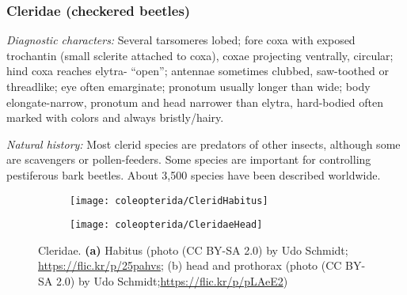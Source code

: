 \subsubsection{Cleridae (checkered beetles)}
\noindent{}\textit{Diagnostic characters:} Several tarsomeres lobed; fore coxa with exposed trochantin (small sclerite attached to coxa), coxae projecting ventrally, circular; hind coxa reaches elytra- ``open''; antennae sometimes clubbed, saw-toothed or threadlike; eye often emarginate; pronotum usually longer than wide; body elongate-narrow, pronotum and head narrower than elytra, hard-bodied often marked with colors and always bristly/hairy.\vspace{3mm}

\noindent{}\textit{Natural history:} Most clerid species are predators of other insects, although some are scavengers or pollen-feeders. Some species are important for controlling pestiferous bark beetles. About 3,500 species have been described worldwide.

\begin{figure}[ht!]
  \centering
\begin{subfigure}[ht!]{0.45\textwidth}
    \texttt{[image: coleopterida/CleridHabitus]}
  \caption{}
\end{subfigure}
\hfill
\begin{subfigure}[ht!]{0.4\textwidth}
    \texttt{[image: coleopterida/CleridaeHead]}
  \caption{}
  \end{subfigure}
    \caption{Cleridae. \textbf{(a)} Habitus (photo (CC BY-SA 2.0) by Udo Schmidt; \url{https://flic.kr/p/25pahvs}; (b) head and prothorax (photo (CC BY-SA 2.0) by Udo Schmidt;\url{https://flic.kr/p/pLAeE2})}\label{fig:clerid}
\end{figure}
